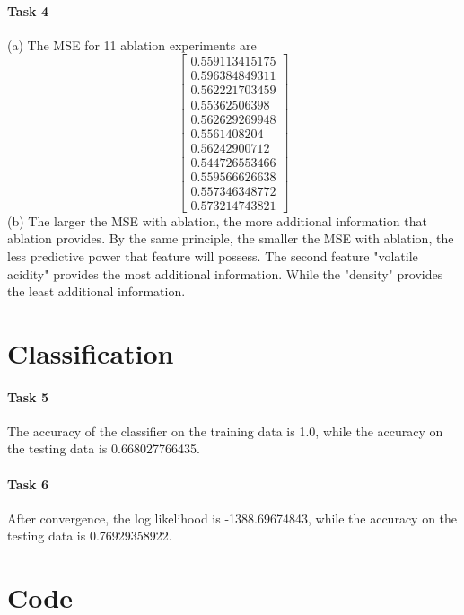 \documentclass[a4paper,11pt]{article}
\theoremstyle{mytheor}
\begin{document}
\paragraph{Task 4}
(a) The MSE for 11 ablation experiments are 
$$
\begin{bmatrix}
0.559113415175\\
0.596384849311\\
0.562221703459\\
0.55362506398\\
0.562629269948\\
0.5561408204\\
0.56242900712\\
0.544726553466\\
0.559566626638\\
0.557346348772\\
0.573214743821
\end{bmatrix}
$$
(b) The larger the MSE with ablation, the more additional information that ablation provides. By the same principle, the smaller the MSE with ablation, the less predictive power that feature will possess. The second feature "volatile acidity" provides the most additional information. While the "density" provides the least additional information.
\clearpage

\section{Classification}

\paragraph{Task 5}
The accuracy of the classifier on the training data is 1.0, while the accuracy on the testing data is 0.668027766435.

\paragraph{Task 6}
After convergence, the log likelihood is -1388.69674843, while the accuracy on the testing data is 0.76929358922.

\clearpage

\section{Code}
\clearpage
\clearpage
\clearpage
\clearpage
\clearpage
\clearpage
\end{document}
